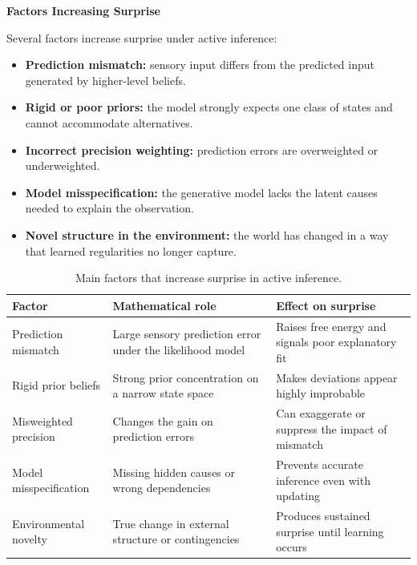 \documentclass{book}
\providecommand{\ProjectDeepHeading}[2]{%
    \par\medskip\noindent\textbf{#2}\par\smallskip
}
\begin{document}
    
    \ProjectDeepHeading{11}{Factors Increasing Surprise}
        Several factors increase surprise under active inference:
        \begin{itemize}[leftmargin=1.8em]
	\item \textbf{Prediction mismatch:} sensory input differs from the predicted input generated by higher-level beliefs.
    \item \textbf{Rigid or poor priors:} the model strongly expects one class of states and cannot accommodate alternatives.
    \item \textbf{Incorrect precision weighting:} prediction errors are overweighted or underweighted.
    \item \textbf{Model misspecification:} the generative model lacks the latent causes needed to explain the observation.
    \item \textbf{Novel structure in the environment:} the world has changed in a way that learned regularities no longer capture.
        \end{itemize}
        
        \begin{table}[H]
            \centering
            \small
            \begin{tabularx}{\textwidth}{>{\raggedright\arraybackslash}p{3.2cm} >{\raggedright\arraybackslash}X >{\raggedright\arraybackslash}X}
		\toprule
        \rowcolor{gray!15}
        \textbf{Factor} & \textbf{Mathematical role} & \textbf{Effect on surprise} \\
        \midrule
        Prediction mismatch & Large sensory prediction error under the likelihood model & Raises free energy and signals poor explanatory fit \\
        Rigid prior beliefs & Strong prior concentration on a narrow state space & Makes deviations appear highly improbable \\
        Misweighted precision & Changes the gain on prediction errors & Can exaggerate or suppress the impact of mismatch \\
        Model misspecification & Missing hidden causes or wrong dependencies & Prevents accurate inference even with updating \\
        Environmental novelty & True change in external structure or contingencies & Produces sustained surprise until learning occurs \\
        \bottomrule
            \end{tabularx}
            \caption{Main factors that increase surprise in active inference.}
        \end{table}
    
\end{document}
